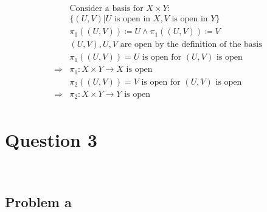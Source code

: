 \documentclass{article}
\begin{document}
\begin{equation*}
    \begin{split}
        &\text{Consider a basis for }X\times Y:\\
        &\{(U,V)|U\text{ is open in }X,V\text{ is open in }Y\}\\
        &\pi_1((U,V))\coloneqq U\land \pi_1((U,V))\coloneqq V\\
        &(U,V), U, V\text{ are open by the definition of the basis}\\
        &\pi_1((U,V))=U\text{ is open for } (U,V)\text{ is open}\\
        \Rightarrow&\pi_1:X\times Y\rightarrow X\text{ is open}\\
        &\pi_2((U,V))=V\text{ is open for } (U,V)\text{ is open}\\
        \Rightarrow&\pi_2:X\times Y\rightarrow Y\text{ is open}\\
    \end{split}
\end{equation*}

\newpage

\section*{Question 3}

~

\subsection*{Problem a}

~
\end{document}
